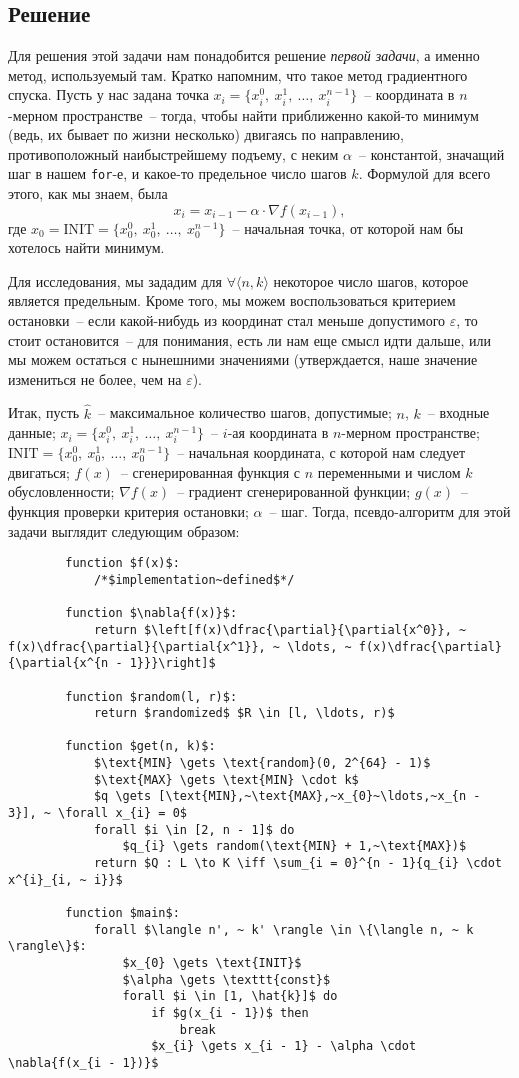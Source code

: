 \documentclass[12pt, a4paper, oneside]{article}
\begin{document}
	\subsection*{Решение}
	Для решения этой задачи нам понадобится решение \textit{первой задачи}, а именно метод, используемый там. Кратко напомним, что такое метод градиентного спуска. Пусть у нас задана точка $x_{i} = \{x^0_i, ~ x^1_i, ~ \ldots, ~ x^{n - 1}_i\}$~-- координата в $n$-мерном пространстве~-- тогда, чтобы найти приближенно какой-то минимум (ведь, их бывает по жизни несколько) двигаясь по направлению, противоположный наибыстрейшему подъему, с неким $\alpha$~-- константой, значащий шаг в нашем \texttt{for}-е, и какое-то предельное число шагов $k$. Формулой для всего этого, как мы знаем, была
	\[
		x_{i} = x_{i - 1} - \alpha \cdot \nabla{f(x_{i - 1})},
	\] где $x_{0} = \text{INIT} = \{x^0_0, ~ x^1_0, ~ \ldots, ~ x^{n - 1}_0\}$~-- начальная точка, от которой нам бы хотелось найти минимум.

	Для исследования, мы зададим для $\forall \langle n, k \rangle$ некоторое число шагов, которое является предельным. Кроме того, мы можем воспользоваться критерием остановки~-- если какой-нибудь из координат стал меньше допустимого $\varepsilon$, то стоит остановится~-- для понимания, есть ли нам еще смысл идти дальше, или мы можем остаться с нынешними значениями (утверждается, наше значение измениться не более, чем на $\varepsilon$).

	Итак, пусть $\hat{k}$~-- максимальное количество шагов, допустимые; $n$, $k$~-- входные данные; $x_{i} = \{x^0_i, ~ x^1_i, ~ \ldots, ~ x^{n - 1}_{i}\}$~-- $i$-ая координата в $n$-мерном пространстве; $\text{INIT} = \{x^0_0, ~ x^1_0, ~ \ldots, ~ x^{n - 1}_0\}$~-- начальная координата, с которой нам следует двигаться; $f(x)$~-- сгенерированная функция с $n$ переменными и числом $k$ обусловленности; $\nabla{f(x)}$~-- градиент сгенерированной функции; $g(x)$~-- функция проверки критерия остановки; $\alpha$~-- шаг. Тогда, псевдо-алгоритм для этой задачи выглядит следующим образом:
	\begin{lstlisting}
		function $f(x)$:
			/*$implementation~defined$*/

		function $\nabla{f(x)}$:
			return $\left[f(x)\dfrac{\partial}{\partial{x^0}}, ~ f(x)\dfrac{\partial}{\partial{x^1}}, ~ \ldots, ~ f(x)\dfrac{\partial}{\partial{x^{n - 1}}}\right]$

		function $random(l, r)$:
			return $randomized$ $R \in [l, \ldots, r)$
		
		function $get(n, k)$:
			$\text{MIN} \gets \text{random}(0, 2^{64} - 1)$
			$\text{MAX} \gets \text{MIN} \cdot k$
			$q \gets [\text{MIN},~\text{MAX},~x_{0}~\ldots,~x_{n - 3}], ~ \forall x_{i} = 0$
			forall $i \in [2, n - 1]$ do
				$q_{i} \gets random(\text{MIN} + 1,~\text{MAX})$
			return $Q : L \to K \iff \sum_{i = 0}^{n - 1}{q_{i} \cdot x^{i}_{i, ~ i}}$

		function $main$:
			forall $\langle n', ~ k' \rangle \in \{\langle n, ~ k \rangle\}$:
				$x_{0} \gets \text{INIT}$
				$\alpha \gets \texttt{const}$
				forall $i \in [1, \hat{k}]$ do
					if $g(x_{i - 1})$ then
						break
					$x_{i} \gets x_{i - 1} - \alpha \cdot \nabla{f(x_{i - 1})}$
	\end{lstlisting}
\end{document}
